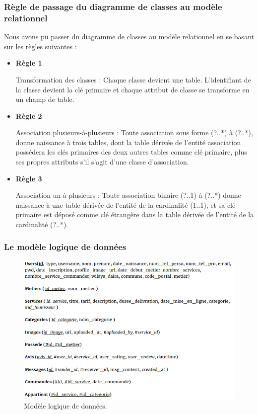 \documentclass[french]{report}
\begin{document}
            \subsubsection{Règle de passage du diagramme de classes au modèle relationnel}
            Nous avons pu passer du diagramme de classes au modèle relationnel en se basant sur les règles suivantes :
            \begin{itemize}
                \item \textbf{Règle 1}
                
                Transformation des classes : Chaque classe devient une table. L'identifiant de la classe
		devient la clé primaire et chaque attribut de classe se transforme en un champ de table.
                
                \item \textbf{Règle 2}
                
                Association plusieurs-à-plusieurs : Toute association sous forme (?..*) à (?..*), 
		donne naissance à trois tables, dont la table dérivée de l'entité association possédera
		les clés primaires des deux autres tables comme clé primaire, plus ses propres attributs 
		s'il s'agit d'une classe d'association.

                \item \textbf{Règle 3}
                
                Association un-à-plusieurs : Toute association binaire (?..1) à (?..*) donne naissance à
		une table dérivée de l'entité de la cardinalité (1..1), et sa clé primaire est déposé comme
		clé étrangère dans la table dérivée de l'entité de la cardinalité (?..*).
            \end{itemize}
            
            \subsubsection{Le modèle logique de données}
           \begin{figure}[H]
            \centering
            \includegraphics[width=1\textwidth]{images/MLD.png}
            \caption{Modèle logique de données.}
            \label{fig:my_label}
        \end{figure}
        
\end{document}
